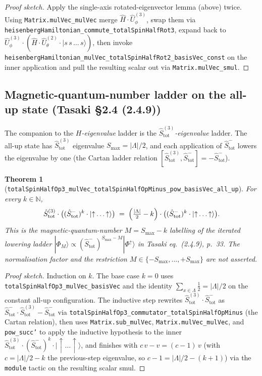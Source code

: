 \documentclass[a4paper,11pt]{article}
\newtheorem{theorem}{Theorem}
\begin{document}
\begin{proof}[Proof sketch]
Apply the single-axis rotated-eigenvector lemma (above) twice.
Using \texttt{Matrix.mulVec\_mulVec} merge $\hat H \cdot \hat
U^{(3)}_{\phi}$, swap them via
\texttt{heisenbergHamiltonian\_commute\_totalSpinHalfRot3}, expand
back to $\hat U^{(3)}_{\phi} \cdot (\hat H \cdot \hat U^{(2)}_{\theta}
\cdot |s\,s\,\dots\,s\rangle)$, then invoke
\texttt{heisenbergHamiltonian\_mulVec\_totalSpinHalfRot2\_basisVec\_const}
on the inner application and pull the resulting scalar out via
\texttt{Matrix.mulVec\_smul}.
\end{proof}

\subsection{Magnetic-quantum-number ladder on the all-up state (Tasaki §2.4 (2.4.9))}
\label{subsec:magnetic-ladder}

The companion to the \emph{$H$-eigenvalue} ladder is the
\emph{$\hat S_{\mathrm{tot}}^{(3)}$-eigenvalue} ladder.  The
all-up state has $\hat S_{\mathrm{tot}}^{(3)}$ eigenvalue
$S_{\max} = |\Lambda|/2$, and each application of $\hat
S_{\mathrm{tot}}^{-}$ lowers the eigenvalue by one (the Cartan
ladder relation $[\hat S_{\mathrm{tot}}^{(3)},\hat
S_{\mathrm{tot}}^{-}] = -\hat S_{\mathrm{tot}}^{-}$).

\begin{theorem}[\texttt{totalSpinHalfOp3\_mulVec\_totalSpinHalfOpMinus\_pow\_basisVec\_all\_up}]
For every $k \in \mathbb{N}$,
\[
  \hat S_{\mathrm{tot}}^{(3)} \cdot
    \bigl((\hat S_{\mathrm{tot}}^{-})^{k} \cdot
            |{\uparrow}\dots{\uparrow}\rangle\bigr)
  \;=\;
  \Bigl(\tfrac{|\Lambda|}{2} - k\Bigr) \cdot
    \bigl((\hat S_{\mathrm{tot}}^{-})^{k} \cdot
            |{\uparrow}\dots{\uparrow}\rangle\bigr).
\]
This is the magnetic-quantum-number $M = S_{\max} - k$ labelling of
the iterated lowering ladder
$|\Phi_{M}\rangle \propto (\hat S_{\mathrm{tot}}^{-})^{S_{\max} - M}
|\Phi^{\uparrow}\rangle$ in Tasaki eq.~(2.4.9), p.~33.  The
normalisation factor and the restriction $M \in \{-S_{\max},\ldots,
+S_{\max}\}$ are not asserted.
\end{theorem}

\begin{proof}[Proof sketch]
Induction on $k$.  The base case $k=0$ uses
\texttt{totalSpinHalfOp3\_mulVec\_basisVec} and the identity
$\sum_{x \in \Lambda} \tfrac{1}{2} = |\Lambda|/2$ on the constant
all-up configuration.  The inductive step rewrites $\hat
S_{\mathrm{tot}}^{(3)} \cdot \hat S_{\mathrm{tot}}^{-}$ as $\hat
S_{\mathrm{tot}}^{-} \cdot \hat S_{\mathrm{tot}}^{(3)} - \hat
S_{\mathrm{tot}}^{-}$ via
\texttt{totalSpinHalfOp3\_commutator\_totalSpinHalfOpMinus} (the
Cartan relation), then uses \texttt{Matrix.sub\_mulVec},
\texttt{Matrix.mulVec\_mulVec}, and \texttt{pow\_succ'} to apply the
inductive hypothesis to the inner $\hat S_{\mathrm{tot}}^{(3)}\cdot
(\hat S_{\mathrm{tot}}^{-})^{k}\cdot|{\uparrow}\dots{\uparrow}\rangle$,
and finishes with $c\,v - v = (c-1)\,v$ (with $c = |\Lambda|/2 - k$
the previous-step eigenvalue, so $c-1 = |\Lambda|/2 - (k+1)$) via the
\texttt{module} tactic on the resulting scalar smul.
\end{proof}
\end{document}
